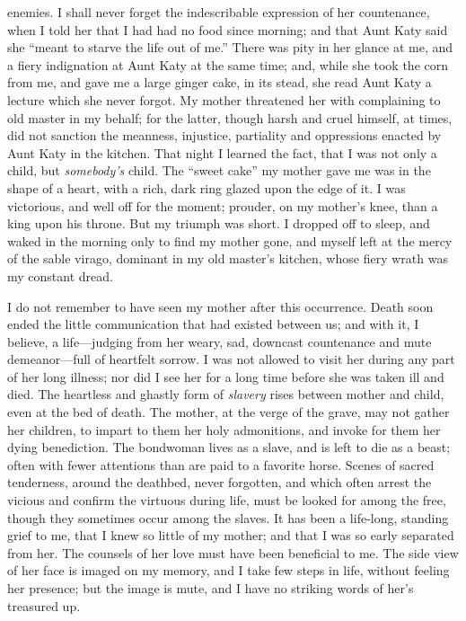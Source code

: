 enemies. I shall never forget the indescribable expression of her
countenance, when I told her that I had had no food since morning; and
that Aunt Katy said she ``meant to starve the life out of me.'' There
was pity in her glance at me, and a fiery indignation at Aunt Katy at
the same time; and, while she took the corn from me, and gave me a large
ginger cake, in its stead, she read Aunt Katy a lecture which she never
forgot. My mother threatened her with complaining to old master in my
behalf; for the latter, though harsh and cruel himself, at times, did
not sanction the meanness, injustice, partiality and oppressions enacted
by Aunt Katy in the kitchen. That night I learned the fact, that I was
not only a child, but \emph{somebody's} child. The ``sweet cake'' my
mother gave me was in the shape of a heart, with a rich, dark ring
glazed upon the edge of it. I was victorious, and well off for the
moment; prouder, on my mother's knee, than a king upon his throne. But
my triumph was short. I dropped off to
{\protect\hypertarget{57}{}{}}sleep, and waked in the morning only to
find my mother gone, and myself left at the mercy of the sable virago,
dominant in my old master's kitchen, whose fiery wrath was my constant
dread.

I do not remember to have seen my mother after this occurrence. Death
soon ended the little communication that had existed between us; and
with it, I believe, a life---judging from her weary, sad, downcast
countenance and mute demeanor---full of heartfelt sorrow. I was not
allowed to visit her during any part of her long illness; nor did I see
her for a long time before she was taken ill and died. The heartless and
ghastly form of \emph{slavery} rises between mother and child, even at
the bed of death. The mother, at the verge of the grave, may not gather
her children, to impart to them her holy admonitions, and invoke for
them her dying benediction. The bondwoman lives as a slave, and is left
to die as a beast; often with fewer attentions than are paid to a
favorite horse. Scenes of sacred tenderness, around the deathbed, never
forgotten, and which often arrest the vicious and confirm the virtuous
during life, must be looked for among the free, though they sometimes
occur among the slaves. It has been a life-long, standing grief to me,
that I knew so little of my mother; and that I was so early separated
from her. The counsels of her love must have been beneficial to me. The
side view of her face is imaged on my memory, and I take few steps in
life, without feeling her presence; but the image is mute, and I have no
striking words of her's treasured up.

